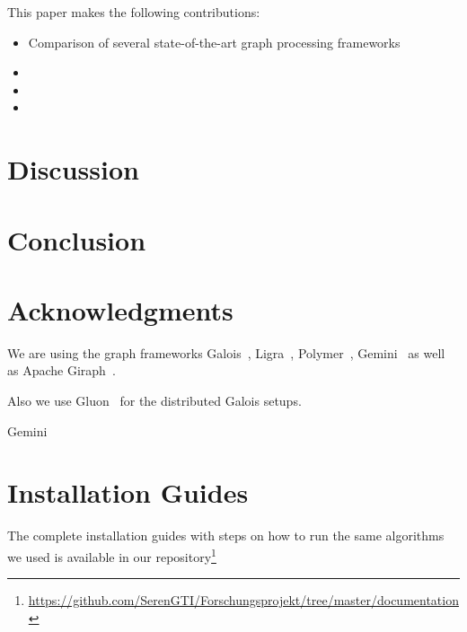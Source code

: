 \documentclass[a4paper]{IEEEtran}
\begin{document}



This paper makes the following contributions:
\begin{itemize}
  \item Comparison of several state-of-the-art graph processing frameworks
  \item
  \item
  \item
\end{itemize}











\section{Discussion}




\section{Conclusion}



\clearpage


\section*{Acknowledgments}
We are using the graph frameworks Galois~\cite{Galois}, Ligra~\cite{Ligra}, Polymer~\cite{Polymer}, Gemini~\cite{Gemini} as well as Apache Giraph~\cite{Giraph}.

Also we use Gluon~\cite{vertGalois} for the distributed Galois setups.

Gemini~\cite{Gemini}




\appendices
\section{Installation Guides}\label{app:installationGuides}
The complete installation guides with steps on how to run the same algorithms we used is available in our repository\footnote{\url{https://github.com/SerenGTI/Forschungsprojekt/tree/master/documentation}}
\end{document}
